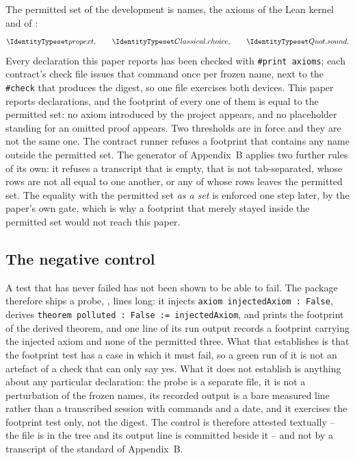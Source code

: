 The permitted set of the development is \NumPermittedAxioms{} names, the axioms
of the Lean kernel and of :
\[
  \lmod{propext},\qquad \lmod{Classical.choice},\qquad \lmod{Quot.sound}.
\]
Every declaration this paper reports has
been checked with \texttt{\#print axioms}; each contract's check file issues that
command once per frozen name, next to the \texttt{\#check} that produces the
digest, so one file exercises both devices. This paper reports
\NumChainTheorems{} declarations, and the footprint of every one of them is equal
to the permitted set: no axiom introduced by the project appears, and no
placeholder standing for an omitted proof appears. Two thresholds are in force
and they are not the same one. The contract runner refuses a footprint that
contains any name outside the permitted set. The generator of Appendix~B applies
two further rules of its own: it refuses a transcript that is empty, that is not
tab-separated, whose rows are not all equal to one another, or any of whose rows
leaves the permitted set. The equality with the permitted set \emph{as a set} is
enforced one step later, by the paper's own gate, which is why a footprint that
merely stayed inside the permitted set would not reach this paper.

\subsection{The negative control}

A test that has never failed has not been shown to be able to fail. The package
therefore ships a probe, ,
\NumNegativeControlLines{} lines long: it injects
\texttt{axiom injectedAxiom : False}, derives
\texttt{theorem polluted : False := injectedAxiom}, and prints the footprint of
the derived theorem, and one line of its run output records a footprint carrying
the injected axiom and none of the permitted three. What that
establishes is that the footprint test has a case in which it must fail, so a
green run of it is not an artefact of a check that can only say yes. What it does
not establish is anything about any particular declaration: the probe is a
separate file, it is not a perturbation of the frozen names, its recorded output
is a bare measured line rather than a transcribed session with commands and a
date, and it exercises the footprint test only, not the digest. The control is
therefore attested textually -- the file is in the tree and its output line is
committed beside it -- and not by a transcript of the standard of Appendix~B.

